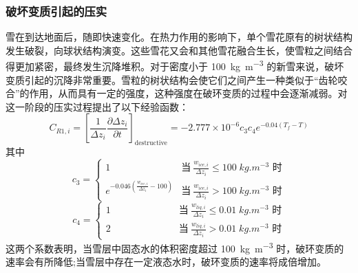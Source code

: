 \subsubsection{破坏变质引起的压实}
雪在到达地面后，随即快速变化。在热力作用的影响下，单个雪花原有的树状结构发生破裂，向球状结构演变。这些雪花又会和其他雪花融合生长，使雪粒之间结合得更加紧密，最终发生沉降堆积。对于密度小于 \qty{100}{kg.m^{-3}} 的新雪来说，破坏变质引起的沉降非常重要。雪粒的树状结构会使它们之间产生一种类似于“齿轮咬合”的作用，从而具有一定的强度，这种强度在破环变质的过程中会逐渐减弱。\citet{anderson1976point}对这一阶段的压实过程提出了以下经验函数：
\begin{equation}\label{eq:DestruciveCompact}
C_{R1,i}=\left[\frac{1}{\Delta {z_i}} \frac{\partial \Delta {z_i}}{\partial {t}}\right]_{\text {destructive}}=-2.777 \times 10^{-6} {c}_{3} {c}_{4} {e}^{-0.04\left(T_f-T\right)}
\end{equation}
其中
\begin{equation}
    c_3=\begin{cases}
        1 &\text{当}\ \frac{w_{ice,i}}{\Delta z_i} \leqslant 100 \;\unit{kg.m^{-3}}\text{ 时} \\
        e^{-0.046\left(\frac{w_{ice,i}}{\Delta z_i}-100\right)} &\text{当}\ \frac{w_{ice,i}}{\Delta z_i}>100 \;\unit{kg.m^{-3}}\text{ 时}
    \end{cases}
\end{equation}
\begin{equation}
    c_4=\begin{cases}
        1 &\qquad \quad \qquad \quad \;\text{当}\ \frac{w_{liq,i}}{\Delta z_i} \leqslant 0.01 \;\unit{kg.m^{-3}}\text{ 时} \\
        2 &\qquad \quad \qquad \quad \;\text{当}\ \frac{w_{liq,i}}{\Delta z_i}>0.01 \;\unit{kg.m^{-3}}\text{ 时}
    \end{cases}
\end{equation}
这两个系数表明，当雪层中固态水的体积密度超过 \qty{100}{kg.m^{-3}} 时，破环变质的速率会有所降低;当雪层中存在一定液态水时，破环变质的速率将成倍增加。


